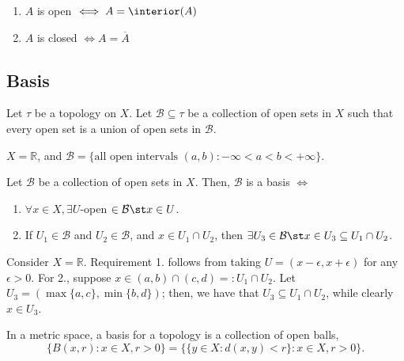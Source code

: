 \begin{proposition}
    \begin{enumerate}
        \item $A$ is open $\iff A = \interior (A)$
        \item $A$ is closed $\iff A = \overline{A}$
    \end{enumerate}
\end{proposition}

\subsection{Basis}
\begin{definition}
    Let $\tau$ be a topology on $X$. Let $\mathcal{B} \subseteq \tau$ be a collection of open sets in $X$ such that every open set is a union of open sets in $\mathcal{B}$.
\end{definition}

\begin{example}
    $X = \mathbb{R}$, and $\mathcal{B} = \{\text{all open intervals } (a, b) : - \infty < a < b < + \infty\}$.
\end{example}

\begin{proposition}\label{prop:basisconsequence}
    Let $\mathcal{B}$ be a collection of open sets in $X$. Then, $\mathcal{B}$ is a basis $\iff$ \begin{enumerate}
        \item $\forall x \in X, \exists U$-open $\in \mathcal{B} \st x \in U$.
        \item If $U_1 \in \mathcal{B}$ and $U_2 \in \mathcal{B}$, and $x \in U_1 \cap U_2$, then $\exists U_3 \in \mathcal{B} \st x \in U_3 \subseteq U_1 \cap U_2$.
    \end{enumerate}
\end{proposition}

\begin{example}
    Consider $X = \mathbb{R}$. Requirement 1. follows from taking $U = (x - \epsilon, x + \epsilon)$ for any $\epsilon > 0$. For 2., suppose $x \in (a, b) \cap (c, d) =: U_1 \cap U_2$. Let $U_3 = (\max \{a, c\}, \min \{b, d\})$; then, we have that $U_3 \subseteq U_1 \cap U_2$, while clearly $x \in U_3$.
\end{example}

\begin{proposition}
    In a metric space, a basis for a topology is a collection of open balls, \[
    \{B(x, r) : x \in X, r > 0\} = \{\{y \in X : d(x, y) < r\} : x \in X , r > 0\}.
    \]
\end{proposition}

